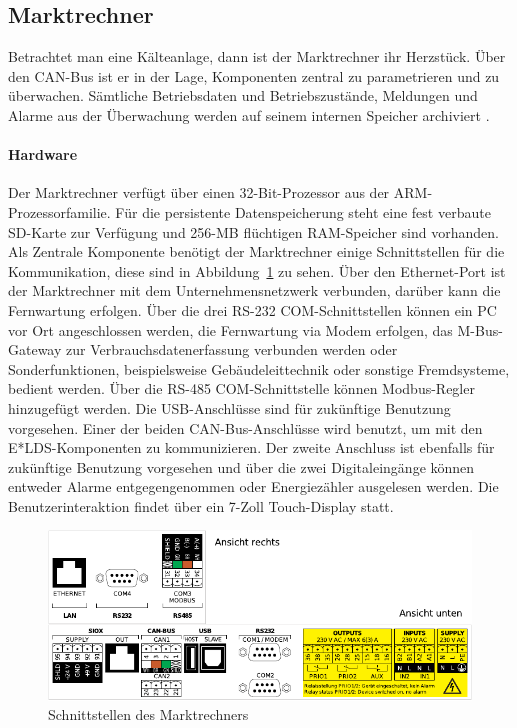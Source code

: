 \documentclass[11pt,a4paper]{report}
\begin{document}
\subsection{Marktrechner} \label{sec:marktrechner} 
Betrachtet man eine Kälteanlage, dann ist der Marktrechner ihr Herzstück. Über den CAN-Bus ist er in der Lage, Komponenten zentral zu parametrieren und zu überwachen. Sämtliche Betriebsdaten und Betriebszustände, Meldungen und Alarme aus der Überwachung werden auf seinem internen Speicher archiviert \cite{elds}.

\paragraph{Hardware} Der Marktrechner verfügt über einen 32-Bit-Prozessor aus der ARM-Prozessorfamilie. Für die persistente Datenspeicherung steht eine fest verbaute SD-Karte zur Verfügung und 256-MB flüchtigen RAM-Speicher sind vorhanden. Als Zentrale Komponente benötigt der Marktrechner einige Schnittstellen für die Kommunikation, diese sind in Abbildung~\ref{fig:marktrechner_interfaces} zu sehen. Über den Ethernet-Port ist der Marktrechner mit dem Unternehmensnetzwerk verbunden, darüber kann die Fernwartung erfolgen. Über die drei RS-232 COM-Schnittstellen können ein PC vor Ort angeschlossen werden, die Fernwartung via Modem erfolgen, das M-Bus-Gateway zur Verbrauchsdatenerfassung verbunden werden oder Sonderfunktionen, beispielsweise Gebäudeleittechnik oder sonstige Fremdsysteme, bedient werden. Über die RS-485 COM-Schnittstelle können Modbus-Regler hinzugefügt werden. Die USB-Anschlüsse sind für zukünftige Benutzung vorgesehen. Einer der beiden CAN-Bus-Anschlüsse wird benutzt, um mit den E*LDS-Komponenten zu kommunizieren. Der zweite Anschluss ist ebenfalls für zukünftige Benutzung vorgesehen und über die zwei Digitaleingänge können entweder Alarme entgegengenommen oder Energiezähler ausgelesen werden. Die Benutzerinteraktion findet über ein 7-Zoll Touch-Display statt.

\begin{figure}[htbp]
\centering
\includegraphics[scale=1.1]{images/CI4000_Hardware_Sticker.pdf}
\caption{Schnittstellen des Marktrechners}
\label{fig:marktrechner_interfaces}
\end{figure}
\end{document}
